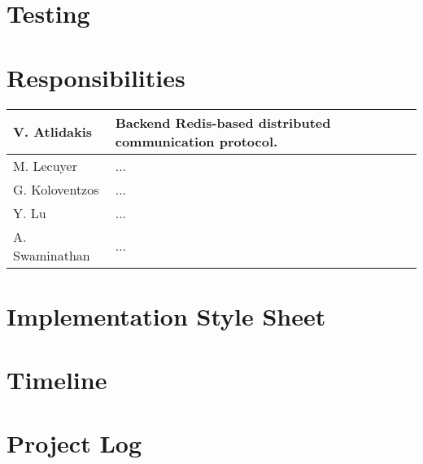 \section{Testing}

\section{Responsibilities}
\begin{center}
    \begin{tabular}{ | l || l |}
    \hline
    V. Atlidakis & Backend Redis-based distributed communication protocol.\\ \hline
    M. Lecuyer & ... \\ \hline
    G. Koloventzos & ... \\
    Y. Lu & ...  \\
    A. Swaminathan  &  ... \\
    \hline
    \end{tabular}
\end{center}

\section{Implementation Style Sheet}

\section{Timeline}


\section{Project Log}
